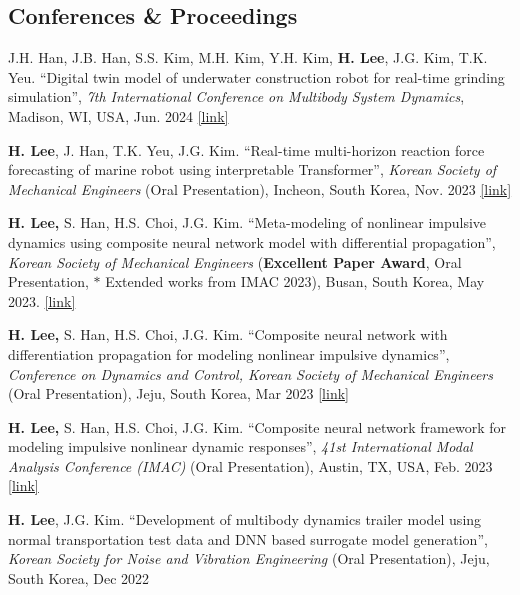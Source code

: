 \documentclass[a4paper,10pt]{extarticle}
\begin{document}
\subsection*{Conferences \& Proceedings}
\begin{etaremune}[leftmargin=.5cm, itemsep=0.05cm]
	\item J.H. Han, J.B. Han, S.S. Kim, M.H. Kim, Y.H. Kim, \textbf{H. Lee}, J.G. Kim, T.K. Yeu. “Digital twin model of underwater construction robot for real-time grinding simulation”, \textit{7th International Conference on Multibody System Dynamics}, Madison, WI, USA, Jun. 2024 \href{https://easychair.org/publications/preprint/WkF3}{[link]}
	\item \textbf{H. Lee}, J. Han, T.K. Yeu, J.G. Kim. “Real-time multi-horizon reaction force forecasting of marine robot using interpretable Transformer”, \textit{Korean Society of Mechanical Engineers} (Oral Presentation), Incheon, South Korea, Nov. 2023  \href{https://www.dbpia.co.kr/Journal/articleDetail?nodeId=NODE11709087}{[link]}
	\item \textbf{H. Lee,} S. Han, H.S. Choi, J.G. Kim. “Meta-modeling of nonlinear impulsive dynamics using composite neural network model with differential propagation”, \textit{Korean Society of Mechanical Engineers} (\textbf{Excellent Paper Award}, Oral Presentation, $*$ Extended works from IMAC 2023), Busan, South Korea, May 2023. \href{https://www.dbpia.co.kr/journal/articleDetail?nodeId=NODE11511050}{[link]}
	\item \textbf{H. Lee,} S. Han, H.S. Choi, J.G. Kim. “Composite neural network with differentiation propagation for modeling nonlinear impulsive dynamics”, \textit{Conference on Dynamics and Control, Korean Society of Mechanical Engineers} (Oral Presentation), Jeju, South Korea, Mar 2023 \href{https://www.dbpia.co.kr/Journal/articleDetail?nodeId=NODE11527668}{[link]}
	\item \textbf{H. Lee,} S. Han, H.S. Choi, J.G. Kim. “Composite neural network framework for modeling impulsive nonlinear dynamic responses”, \textit{41st International Modal Analysis Conference (IMAC)} (Oral Presentation), Austin, TX, USA, Feb. 2023 \href{https://link.springer.com/chapter/10.1007/978-3-031-34946-1_21}{[link]}
	\item \textbf{H. Lee}, J.G. Kim. “Development of multibody dynamics trailer model using normal transportation test data and DNN based surrogate model generation”, \textit{Korean Society for Noise and Vibration Engineering} (Oral Presentation), Jeju, South Korea, Dec 2022
\end{etaremune}
\end{document}
